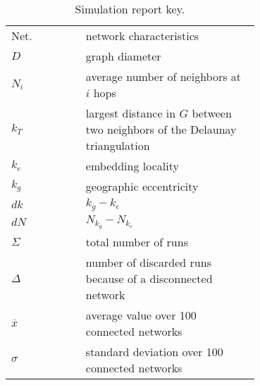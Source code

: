 \documentclass{article}
\renewcommand{\arraystretch}{1.5}
\begin{document}
\begin{table}[h]
\begin{center}
\small
\renewcommand{\arraystretch}{1.1}
\begin{tabular}{l p{0.7\linewidth}}
\hline
Net. & network characteristics\\
$D$ & graph diameter\\
$N_i$ & average number of neighbors at $i$ hops\\
$k_T$ & largest distance in $G$ between two neighbors of the Delaunay triangulation\\
$k_e$ & embedding locality\\
$k_g$ & geographic eccentricity\\
$dk$ & $k_g-k_e$\\
$dN$ & $N_{k_g}-N_{k_e}$\\
\hline
$\Sigma$ & total number of runs\\
$\Delta$ & number of discarded runs because of a disconnected network\\
$\overline{x}$ & average value over 100 connected networks\\
$\sigma$ & standard deviation over 100 connected networks\\
\hline
\end{tabular}
\end{center}
\caption{Simulation report key.}
\label{tab_key}
\end{table}

\renewcommand{\arraystretch}{1}
\small
\end{document}
